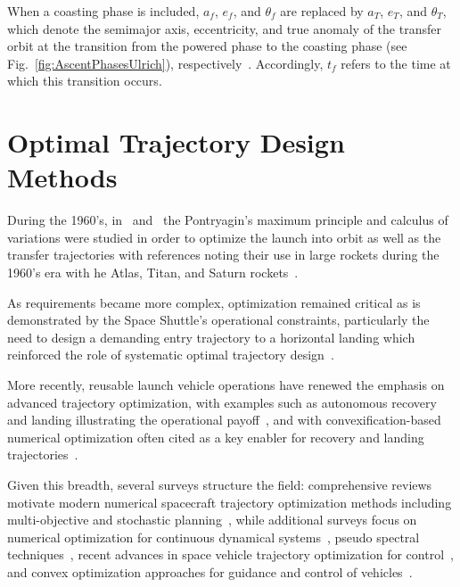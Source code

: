 When a coasting phase is included, $a_f$, $e_f$, and $\theta_f$ are replaced by $a_T$, $e_T$, and $\theta_T$, which denote the semimajor axis, eccentricity, and true anomaly of the transfer orbit at the transition from the powered phase to the coasting phase (see Fig.~\ref{fig:AscentPhasesUlrich}), respectively~\cite{Ulrich}. Accordingly, $t_f$ refers to the time at which this transition occurs.


\section{Optimal Trajectory Design Methods}

During the 1960's, in~\cite{bryson1958optimum} and~\cite{Lawden} the Pontryagin’s maximum principle and calculus of variations were studied in order to optimize the launch into orbit as well as the transfer trajectories with references noting their use in large rockets during the 1960's era with he Atlas, Titan, and Saturn rockets~\cite{brusch1976trajectory}.

As requirements became more complex, optimization remained critical as is demonstrated by the Space Shuttle's operational constraints, particularly the need to design a demanding entry trajectory to a horizontal landing which reinforced the role of systematic optimal trajectory design~\cite{BollinoNavalOptim}.

More recently, reusable launch vehicle operations have renewed the emphasis on advanced trajectory optimization, with examples such as autonomous recovery and landing illustrating the operational payoff~\cite{Edberg}, and with convexification-based numerical optimization often cited as a key enabler for recovery and landing trajectories~\cite{Convex}.

Given this breadth, several surveys structure the field: comprehensive reviews motivate modern numerical spacecraft trajectory optimization methods including multi-objective and stochastic planning~\cite{Optimization_Review}, while additional surveys focus on numerical optimization for continuous dynamical systems~\cite{BettsSurvey1998}, pseudo spectral techniques~\cite{RaoPseudo}, recent advances in space vehicle trajectory optimization for control~\cite{MALYUTA2021282}, and convex optimization approaches for guidance and control of vehicles~\cite{WANG2024100957}.

